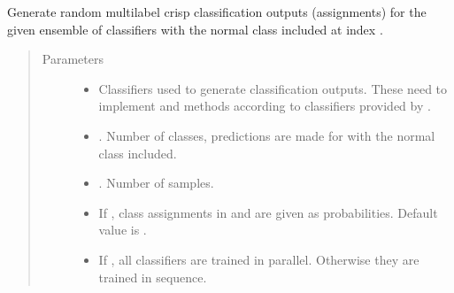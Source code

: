 \documentclass[letterpaper,10pt,english]{sphinxmanual}
\begin{document}
\begin{fulllineitems}
\label{\detokenize{pusion.util.generator:pusion.util.generator.generate_multilabel_ensemble_classification_outputs}}
\sphinxAtStartPar
Generate random multilabel crisp classification outputs (assignments) for the given ensemble of classifiers with
the normal class included at index .
\begin{quote}\begin{description}
\item[{Parameters}] \leavevmode\begin{itemize}
\item {} 
\sphinxAtStartPar
{} \textendash{} Classifiers used to generate classification outputs.
These need to implement  and  methods according to classifiers provided by .

\item {} 
\sphinxAtStartPar
{} \textendash{} . Number of classes, predictions are made for with the normal class included.

\item {} 
\sphinxAtStartPar
{} \textendash{} . Number of samples.

\item {} 
\sphinxAtStartPar
{} \textendash{} If , class assignments in  and  are given as
probabilities. Default value is .

\item {} 
\sphinxAtStartPar
{} \textendash{} If , all classifiers are trained in parallel. Otherwise they are trained in sequence.

\end{itemize}


\end{description}
\end{quote}
\end{fulllineitems}
\end{document}

